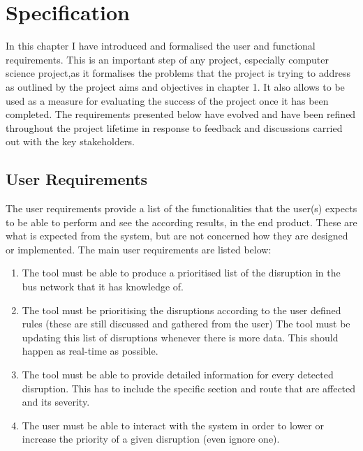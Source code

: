 \chapter{Specification}
In this chapter I have introduced and formalised the user and functional requirements.
This is an important step of any project, especially computer science project,as it formalises the problems that the project is trying to address as outlined by the project aims and objectives in chapter 1. It also allows to be used as a measure for evaluating the success of the project once it has been completed. The requirements presented below have evolved and have been refined throughout the project lifetime in response to feedback and discussions carried out with the key stakeholders.

\section{User Requirements}
The user requirements provide a list of the functionalities that the user(s) expects to be able to perform and see the according results, in the end product. These are what is expected from the system, but are not concerned how they are designed or implemented. The main user requirements are listed below:
\begin{enumerate}
	\item The tool must be able to produce a prioritised list of the disruption in
the bus network that it has knowledge of.
	\item The tool must be prioritising the disruptions according to the user defined
rules (these are still discussed and gathered from the user)
The tool must be updating this list of disruptions whenever there is more
data. This should happen as real-time as possible.
	\item The tool must be able to provide detailed information for every detected disruption. This has to include the specific section and route that are affected and its severity.
	\item The user must be able to interact with the system in order to lower or
increase the priority of a given disruption (even ignore one).
\end{enumerate}

